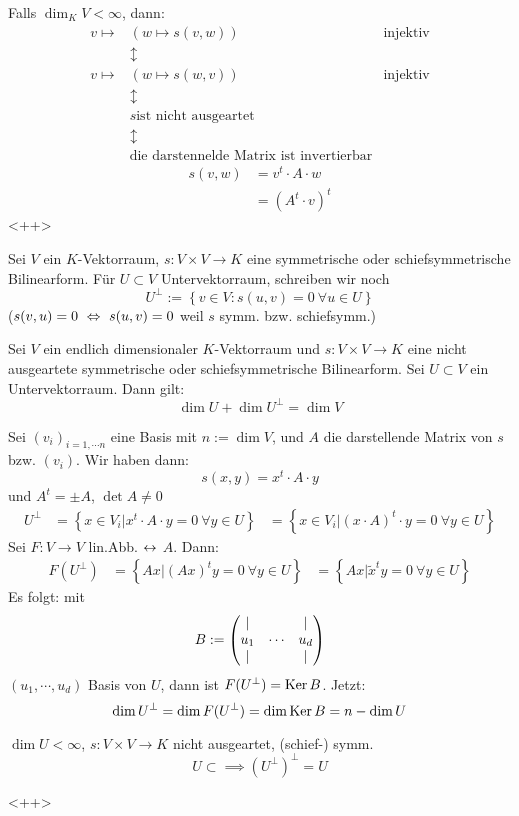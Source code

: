 \begin{Bem}
  Falls $\dim_K V <\infty$, dann:
  \begin{align*}
    v\mapsto & \left(w\mapsto s(v,w)\right) & \text{injektiv}\\
    &\updownarrow \\
    v\mapsto & \left(w\mapsto s(w,v)\right) & \text{injektiv}\\
    &\updownarrow \\
    &s \text{ist nicht ausgeartet}\\
    &\updownarrow \\
    &\text{die darstennelde Matrix ist invertierbar}
  \end{align*}
  \begin{align*}
    s(v,w) & = v^t\cdot A \cdot w\\
    & = \left( A^t\cdot v \right)^t
  \end{align*}<++>
\end{Bem}
\begin{Sat}
  Sei $V$ ein $K$-Vektorraum, $s:V\times V\to K$ eine symmetrische oder schiefsymmetrische Bilinearform. Für $U\subset V$ Untervektorraum, schreiben wir noch
  \[U^\perp := \left\{ v\in V:s(u,v)=0\ \forall u\in U \right\}\]
  ($s(v,u)=0\ \Leftrightarrow\ s(u,v)=0$ weil $s$ symm. bzw. schiefsymm.)
\end{Sat}
\begin{Prop}
  Sei $V$ ein endlich dimensionaler $K$-Vektorraum und $s:V\times V\to K$ eine nicht ausgeartete symmetrische oder schiefsymmetrische Bilinearform. Sei $U\subset V$ ein Untervektorraum. Dann gilt:
  \[\dim U+\dim U^\perp=\dim V\]
\end{Prop}
\begin{Bew}
  Sei $(v_i)_{i=1,\cdots n}$ eine Basis mit $n:=\dim V$, und $A$ die darstellende Matrix von $s$ bzw. $(v_i)$. Wir haben dann:
  \[s(x,y)=x^t\cdot A \cdot y\]
  und $A^t=\pm A$, $\det A\neq 0$
  \begin{align*}
    U^\perp &= \left\{ x\in V_i| x^t\cdot A \cdot y=0\ \forall y\in U \right\}
    &= \left\{ x\in V_i| (x\cdot A)^t \cdot y=0\ \forall y\in U \right\}
  \end{align*}
  Sei $F:V\to V$ lin.Abb. $\leftrightarrow$ $A$. Dann:
  \begin{align*}
    F(U^\perp) &=\left\{ Ax|(Ax)^ty=0\ \forall y\in U \right\}
    &=\left\{ Ax|\tilde{x}^ty=0\ \forall y\in U \right\}
  \end{align*}
  Es folgt: mit
  \[B:=\begin{pmatrix}| & & |\\ u_1 & \cdots & u_d \\ | & & |\end{pmatrix}\]
  $(u_1,\cdots,u_d)$ Basis von $U$, dann ist $F(U^\perp)=\operatorname{Ker} B$. Jetzt:
  \[\dim U^\perp = \dim F(U^\perp)=\dim \operatorname{Ker} B=n-\dim U\]
\end{Bew}
\begin{Kor}
  $\dim U<\infty$, $s:V\times V\to K$ nicht ausgeartet, (schief-) symm.
  \[U\subset \implies \left( U^\perp \right)^\perp = U\]
\end{Kor}<++>
